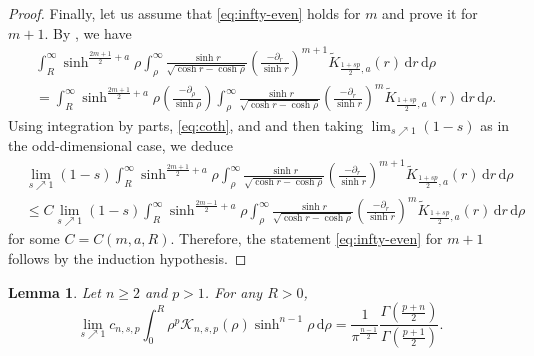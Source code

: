 \documentclass[11pt]{amsart}
\theoremstyle{plain}
\newtheorem{lemma}[theorem]{Lemma}
\theoremstyle{definition}
\numberwithin{equation}{section}
\begin{document}
\begin{proof}
Finally, let us assume that \eqref{eq:infty-even} holds for $m$ and prove it for $m+1$. By , we have
\begin{equation*}
\begin{split}
&\int_{R}^{\infty} \sinh^{\frac{2m+1}{2}+a}\rho \int_{\rho}^{\infty} \frac{\sinh r}{\sqrt{\cosh r - \cosh \rho}} \left( \frac{-\partial_{r}}{\sinh r} \right)^{m+1} \widetilde{K}_{\frac{1+sp}{2},a}(r) \,\mathrm{d}r \,\mathrm{d}\rho \\
&= \int_{R}^{\infty} \sinh^{\frac{2m+1}{2}+a}\rho \left( \frac{-\partial_{\rho}}{\sinh \rho} \right) \int_{\rho}^{\infty} \frac{\sinh r}{\sqrt{\cosh r - \cosh \rho}} \left( \frac{-\partial_{r}}{\sinh r} \right)^{m} \widetilde{K}_{\frac{1+sp}{2},a}(r) \,\mathrm{d}r \,\mathrm{d}\rho.
\end{split}
\end{equation*}
Using integration by parts, \eqref{eq:coth}, and  and then taking $\lim_{s \nearrow 1}(1-s)$ as in the odd-dimensional case, we deduce
\begin{equation*}
\begin{split}
&\lim_{s \nearrow 1} (1-s) \int_{R}^{\infty} \sinh^{\frac{2m+1}{2}+a}\rho \int_{\rho}^{\infty} \frac{\sinh r}{\sqrt{\cosh r - \cosh \rho}} \left( \frac{-\partial_{r}}{\sinh r} \right)^{m+1} \widetilde{K}_{\frac{1+sp}{2},a}(r) \,\mathrm{d}r \,\mathrm{d}\rho \\
&\leq C \lim_{s \nearrow 1} (1-s) \int_{R}^{\infty} \sinh^{\frac{2m-1}{2}+a}\rho \int_{\rho}^{\infty} \frac{\sinh r}{\sqrt{\cosh r - \cosh \rho}} \left( \frac{-\partial_{r}}{\sinh r} \right)^{m} \widetilde{K}_{\frac{1+sp}{2},a}(r) \,\mathrm{d}r \,\mathrm{d}\rho
\end{split}
\end{equation*}
for some $C = C(m, a, R)$. Therefore, the statement \eqref{eq:infty-even} for $m+1$ follows by the induction hypothesis.
\end{proof}

\begin{lemma} \label{lem:zero}
Let $n\geq 2$ and $p > 1$. For any $R > 0$,
\begin{equation} \label{eq:zero}
\lim_{s \nearrow 1} c_{n, s, p} \int_{0}^{R} \rho^{p} \mathcal{K}_{n,s,p}(\rho)\sinh^{n-1}\rho \,\mathrm{d}\rho = \frac{1}{\pi^{\frac{n-1}{2}}} \frac{\Gamma(\frac{p+n}{2})}{\Gamma(\frac{p+1}{2})}.
\end{equation}
\end{lemma}
\end{document}
